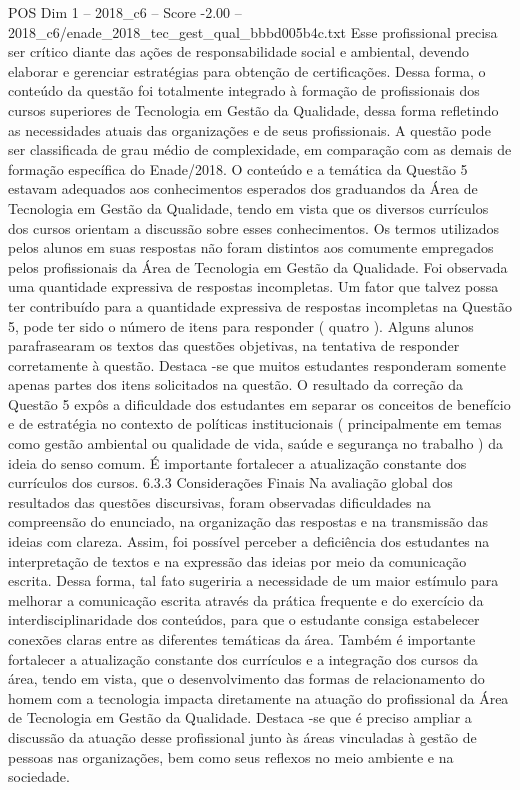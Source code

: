 \begin{textsample}{POS Dim 1 – 2018\_c6 – Score -2.00 – 2018\_c6/enade\_2018\_tec\_gest\_qual\_bbbd005b4c.txt}
Esse profissional precisa ser crítico diante das ações de responsabilidade social e ambiental, devendo elaborar e gerenciar estratégias para obtenção de certificações.
Dessa forma, o conteúdo da questão foi totalmente integrado à formação de profissionais dos cursos superiores de Tecnologia em Gestão da Qualidade, dessa forma refletindo as necessidades atuais das organizações e de seus profissionais.
A questão pode ser classificada de grau médio de complexidade, em comparação com as demais de formação específica do Enade/2018.
O conteúdo e a temática da Questão 5 estavam adequados aos conhecimentos esperados dos graduandos da Área de Tecnologia em Gestão da Qualidade, tendo em vista que os diversos currículos dos cursos orientam a discussão sobre esses conhecimentos.
Os termos utilizados pelos alunos em suas respostas não foram distintos aos comumente empregados pelos profissionais da Área de Tecnologia em Gestão da Qualidade.
Foi observada uma quantidade expressiva de respostas incompletas.
Um fator que talvez possa ter contribuído para a quantidade expressiva de respostas incompletas na Questão 5, pode ter sido o número de itens para responder ( quatro ).
Alguns alunos parafrasearam os textos das questões objetivas, na tentativa de responder corretamente à questão.
Destaca -se que muitos estudantes responderam somente apenas partes dos itens solicitados na questão.
O resultado da correção da Questão 5 expôs a dificuldade dos estudantes em separar os conceitos de benefício e de estratégia no contexto de políticas institucionais ( principalmente em temas como gestão ambiental ou qualidade de vida, saúde e segurança no trabalho ) da ideia do senso comum.
É importante fortalecer a atualização constante dos currículos dos cursos. 6.3.3 Considerações Finais Na avaliação global dos resultados das questões discursivas, foram observadas dificuldades na compreensão do enunciado, na organização das respostas e na transmissão das ideias com clareza.
Assim, foi possível perceber a deficiência dos estudantes na interpretação de textos e na expressão das ideias por meio da comunicação escrita.
Dessa forma, tal fato sugeriria a necessidade de um maior estímulo para melhorar a comunicação escrita através da prática frequente e do exercício da interdisciplinaridade dos conteúdos, para que o estudante consiga estabelecer conexões claras entre as diferentes temáticas da área.
Também é importante fortalecer a atualização constante dos currículos e a integração dos cursos da área, tendo em vista, que o desenvolvimento das formas de relacionamento do homem com a tecnologia impacta diretamente na atuação do profissional da Área de Tecnologia em Gestão da Qualidade.
Destaca -se que é preciso ampliar a discussão da atuação desse profissional junto às áreas vinculadas à gestão de pessoas nas organizações, bem como seus reflexos no meio ambiente e na sociedade.

\end{textsample}
